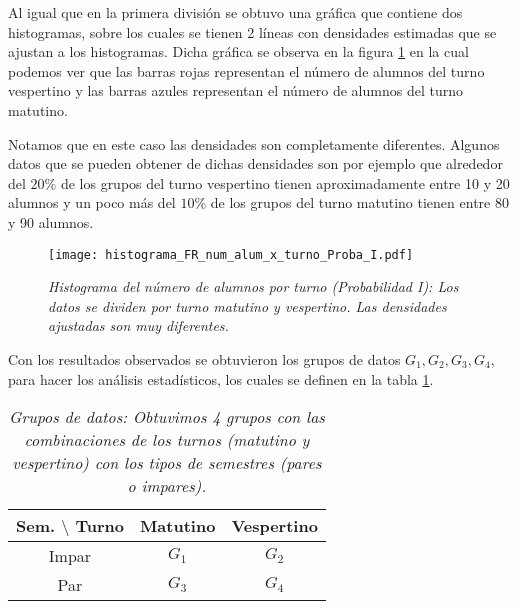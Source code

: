 Al igual que en la primera división se obtuvo una gráfica que contiene dos histogramas, sobre los cuales se tienen 2 líneas con  densidades estimadas que se ajustan a los histogramas. Dicha gráfica se observa en la figura \ref{HistAlumTurnoProbaI} en la cual podemos ver que las barras rojas representan el número de alumnos del turno vespertino y las barras azules representan el número de alumnos del turno matutino.

Notamos que en este caso las densidades son completamente diferentes. Algunos datos que se pueden obtener de dichas densidades son por ejemplo que alrededor del $20\%$ de los grupos del turno vespertino tienen aproximadamente entre 10 y 20 alumnos y un poco más del $10\%$ de los grupos del turno matutino tienen entre 80 y 90 alumnos.

\begin{figure}[H]
\centering
\texttt{[image: histograma\_FR\_num\_alum\_x\_turno\_Proba\_I.pdf]} %
\caption[\textit{Histograma del número de alumnos por turno: Probabilidad I}]{\textit{Histograma del número de alumnos por turno (Probabilidad I): Los datos se dividen por turno matutino y vespertino. Las densidades ajustadas son muy diferentes.}}\label{HistAlumTurnoProbaI}
\end{figure}

Con los resultados observados se obtuvieron los grupos de datos $G_{1}, G_{2}, G_{3}, G_{4}$, para hacer los análisis estadísticos, los cuales se definen en la tabla \ref{GposDatos}.

\begin{table}[H]
\centering
\begin{tabular}{|c|c|c|}
\hline 
\textbf{Sem.} $\setminus$ \textbf{Turno} & \textbf{Matutino} & \textbf{Vespertino} \\ 
\hline 
Impar & $G_{1}$ & $G_{2}$ \\ 
\hline 
Par & $G_{3}$ & $G_{4}$ \\ 
\hline 
\end{tabular}
\caption[\textit{Grupos de datos}]{\textit{Grupos de datos: Obtuvimos 4 grupos con las combinaciones de los turnos (matutino y vespertino) con los tipos de semestres (pares o impares).}}\label{GposDatos}
\end{table}
